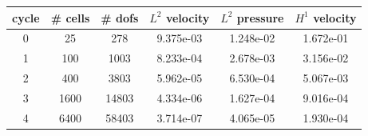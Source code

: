 \documentclass[10pt]{report}
\begin{document}
\begin{table}[H]
\begin{center}
\begin{tabular}{|c|c|c|c|c|c|} \hline
cycle & \# cells & \# dofs & $L^2$ velocity & $L^2$ pressure & $H^1$ velocity\\ \hline
0 & 25 & 278 & 9.375e-03 & 1.248e-02 & 1.672e-01\\ \hline
1 & 100 & 1003 & 8.233e-04 & 2.678e-03 & 3.156e-02\\ \hline
2 & 400 & 3803 & 5.962e-05 & 6.530e-04 & 5.067e-03\\ \hline
3 & 1600 & 14803 & 4.334e-06 & 1.627e-04 & 9.016e-04\\ \hline
4 & 6400 & 58403 & 3.714e-07 & 4.065e-05 & 1.930e-04\\ \hline
\end{tabular}
\end{center}
\end{table}
\end{document}
